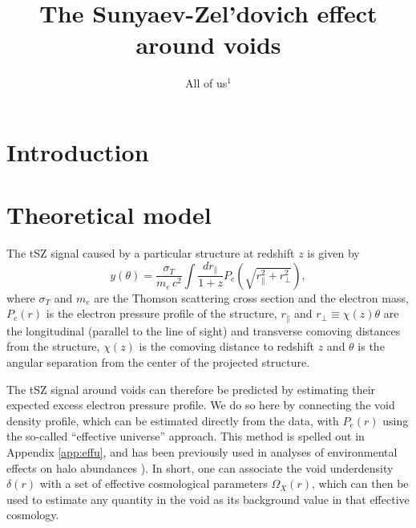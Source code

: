 \documentclass[twocolumn,amsfont,amssymb,amsmath, showpacs,balancelastpage, nofootinbib]{revtex4-1}
\begin{document}
  \title{The Sunyaev-Zel'dovich effect around voids}
  \author{All of us$^1$}

  \begin{abstract}
    \lipsum[0]
  \end{abstract}

  \maketitle

  \section{Introduction}\label{sec:intro}
    \lipsum[1]
    
  \section{Theoretical model}\label{sec:theory}
    The tSZ signal caused by a particular structure at redshift $z$ is given by
    \begin{equation}
      y(\theta)=\frac{\sigma_T}{m_e\,c^2}\int\frac{dr_\parallel}{1+z}P_e\left(\sqrt{r_\parallel^2+r_\perp^2}\right),
    \end{equation}
    where $\sigma_T$ and $m_e$ are the Thomson scattering cross section and the electron mass, $P_e(r)$ is
    the electron pressure profile of the structure, $r_\parallel$ and $r_\perp\equiv \chi(z)\theta$ are
    the longitudinal (parallel to the line of sight) and transverse comoving distances from the structure,
    $\chi(z)$ is the comoving distance to redshift $z$ and $\theta$ is the angular separation from the
    center of the projected structure.

    The tSZ signal around voids can therefore be predicted by estimating their expected excess electron pressure
    profile. We do so here by connecting the void density profile, which can be estimated directly from the data,
    with $P_e(r)$ using the so-called ``effective universe'' approach. This method is spelled out in Appendix
    \ref{app:effu}, and has been previously used in analyses of environmental effects on halo abundances \cite{2003MNRAS.344..715G,2004ApJ...605....1G,2009MNRAS.394.2109M,2015MNRAS.447.2683A}). In short, one can
    associate the void underdensity $\delta(r)$ with a set of effective cosmological parameters $\Omega_X(r)$,
    which can then be used to estimate any quantity in the void as its background value in that effective
    cosmology.
    
\end{document}
